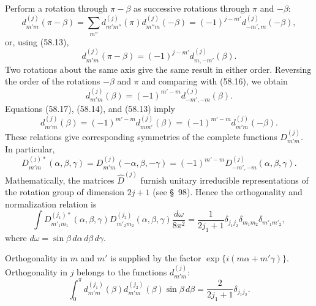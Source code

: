 Perform a rotation through $\pi-\beta$ as successive rotations through $\pi$ and $-\beta$:
\[
 d^{(j)}_{m'm}(\pi-\beta)=\sum_{m''}d^{(j)}_{m'm''}(\pi)d^{(j)}_{m''m}(-\beta)
 =(-1)^{j-m'}d^{(j)}_{-m',m}(-\beta),
\]
or, using (58.13),
\begin{equation}
 d^{(j)}_{m'm}(\pi-\beta)=(-1)^{j-m'}d^{(j)}_{m,-m'}(\beta).
 \tag{58.16}
\end{equation}
Two rotations about the same axis give the same result in either order. Reversing the order of the rotations $-\beta$ and $\pi$ and comparing with (58.16), we obtain
\begin{equation}
 d^{(j)}_{m'm}(\beta)=(-1)^{m'-m}d^{(j)}_{-m',-m}(\beta).
 \tag{58.17}
\end{equation}
Equations (58.17), (58.14), and (58.13) imply
\begin{equation}
 d^{(j)}_{m'm}(\beta)=(-1)^{m'-m}d^{(j)}_{mm'}(\beta)
 =(-1)^{m'-m}d^{(j)}_{m'm}(-\beta).
 \tag{58.18}
\end{equation}
These relations give corresponding symmetries of the complete functions $D^{(j)}_{m'm}$. In particular,
\begin{equation}
 D^{(j)*}_{m'm}(\alpha,\beta,\gamma)=D^{(j)}_{m'm}(-\alpha,\beta,-\gamma)
 =(-1)^{m'-m}D^{(j)}_{-m',-m}(\alpha,\beta,\gamma).
 \tag{58.19}
\end{equation}
Mathematically, the matrices $\hat D^{(j)}$ furnish unitary irreducible representations of the rotation group of dimension $2j+1$ (see §~98). Hence the orthogonality and normalization relation is
\begin{equation}
 \int D^{(j_1)*}_{m'_1m_1}(\alpha,\beta,\gamma)
 D^{(j_2)}_{m'_2m_2}(\alpha,\beta,\gamma)\frac{d\omega}{8\pi^2}
 =\frac1{2j_1+1}\delta_{j_1j_2}\delta_{m_1m_2}\delta_{m'_1m'_2},
 \tag{58.20}
\end{equation}
where $d\omega=\sin\beta\,d\alpha\,d\beta\,d\gamma$.

Orthogonality in $m$ and $m'$ is supplied by the factor $\exp\{i(m\alpha+m'\gamma)\}$. Orthogonality in $j$ belongs to the functions $d^{(j)}_{m'm}$:
\begin{equation}
 \int_0^\pi d^{(j_1)}_{m'm}(\beta)d^{(j_2)}_{m'm}(\beta)
 \sin\beta\,d\beta=\frac2{2j_1+1}\delta_{j_1j_2}.
 \tag{58.21}
\end{equation}

